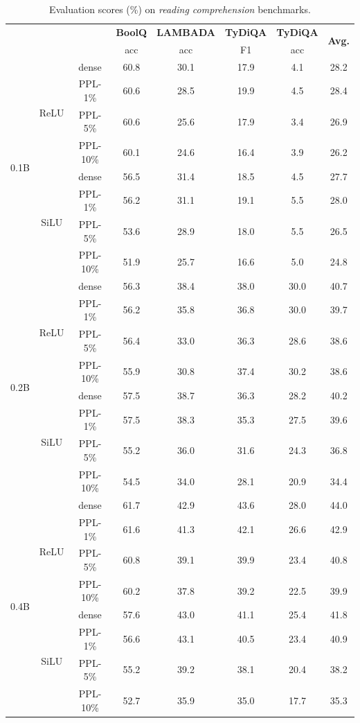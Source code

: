 \documentclass{article} %
\begin{document}
\begin{table}[ht]
\caption{Evaluation scores (\%) on \textit{reading comprehension} benchmarks.}
\label{table:reading-comprehension}
\footnotesize
\begin{center}
\begin{tabular}{c|c|c|ccccc}
\toprule
\multicolumn{3}{c}{} & \textbf{BoolQ} & \textbf{LAMBADA} & \textbf{TyDiQA} & \textbf{TyDiQA}  & \multirow{2}{*}{\textbf{Avg.}} \\
\cmidrule{4-7}
\multicolumn{3}{c}{} & acc & acc & F1 & acc \\

\midrule
\multirow{8}{*}{0.1B} & \multirow{4}{*}{ReLU} 
& dense  & 60.8 & 30.1 & 17.9 & 4.1 & 28.2 \\
& & PPL-1\% & 60.6 & 28.5 & 19.9 & 4.5 & 28.4 \\
& & PPL-5\% & 60.6 & 25.6 & 17.9 & 3.4 & 26.9 \\
& & PPL-10\% & 60.1 & 24.6 & 16.4 & 3.9 & 26.2 \\
\cmidrule{2-8}
& \multirow{4}{*}{SiLU} 
& dense  & 56.5 & 31.4 & 18.5 & 4.5 & 27.7 \\
& & PPL-1\% & 56.2 & 31.1 & 19.1 & 5.5 & 28.0 \\
& & PPL-5\% & 53.6 & 28.9 & 18.0 & 5.5 & 26.5 \\
& & PPL-10\% & 51.9 & 25.7 & 16.6 & 5.0 & 24.8 \\

\midrule
\multirow{8}{*}{0.2B} & \multirow{4}{*}{ReLU} 
& dense  & 56.3 & 38.4 & 38.0 & 30.0 & 40.7 \\
& & PPL-1\% & 56.2 & 35.8 & 36.8 & 30.0 & 39.7 \\
& & PPL-5\% & 56.4 & 33.0 & 36.3 & 28.6 & 38.6 \\
& & PPL-10\% & 55.9 & 30.8 & 37.4 & 30.2 & 38.6 \\
\cmidrule{2-8}
& \multirow{4}{*}{SiLU} 
& dense  & 57.5 & 38.7 & 36.3 & 28.2 & 40.2 \\
& & PPL-1\% & 57.5 & 38.3 & 35.3 & 27.5 & 39.6 \\
& & PPL-5\% & 55.2 & 36.0 & 31.6 & 24.3 & 36.8 \\
& & PPL-10\% & 54.5 & 34.0 & 28.1 & 20.9 & 34.4 \\

\midrule
\multirow{8}{*}{0.4B} & \multirow{4}{*}{ReLU} 
& dense  & 61.7 & 42.9 & 43.6 & 28.0 & 44.0 \\
& & PPL-1\% & 61.6 & 41.3 & 42.1 & 26.6 & 42.9 \\
& & PPL-5\% & 60.8 & 39.1 & 39.9 & 23.4 & 40.8 \\
& & PPL-10\% & 60.2 & 37.8 & 39.2 & 22.5 & 39.9 \\
\cmidrule{2-8}
& \multirow{4}{*}{SiLU} 
& dense  & 57.6 & 43.0 & 41.1 & 25.4 & 41.8 \\
& & PPL-1\% & 56.6 & 43.1 & 40.5 & 23.4 & 40.9 \\
& & PPL-5\% & 55.2 & 39.2 & 38.1 & 20.4 & 38.2 \\
& & PPL-10\% & 52.7 & 35.9 & 35.0 & 17.7 & 35.3 \\


\end{tabular}
\end{center}
\end{table}
\end{document}
